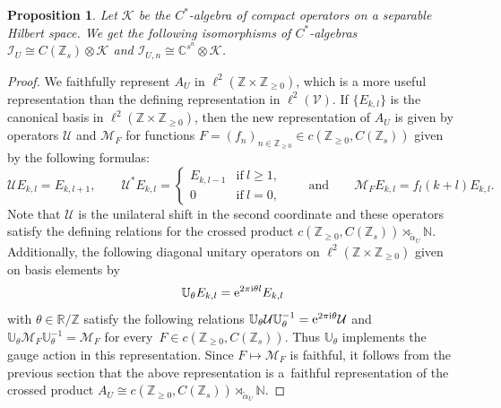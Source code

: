 \documentclass[pdftex]{sigma}
\newcommand{\R}{{\mathbb R}}
\newcommand{\C}{{\mathbb C}}
\newcommand{\N}{{\mathbb N}}
\newcommand{\Z}{{\mathbb Z}}
\newcommand{\kcal}{{\mathcal K}}
\newcommand{\fancyI}{\mathcal{I}}
\numberwithin{equation}{section}
\newtheorem{Proposition}[Theorem]{Proposition}
 { \theoremstyle{definition}
\newtheorem{Definition}[Theorem]{Definition}
\newtheorem{Note}[Theorem]{Note}
\newtheorem{Example}[Theorem]{Example}
\newtheorem{Remark}[Theorem]{Remark} }
\begin{document}
\begin{Proposition}\label{IUStructure}
Let $\mathcal{K}$ be the $C^*$-algebra of compact operators on a separable Hilbert space.
We get the following isomorphisms of $C^*$-algebras
$
\mathcal{I}_U\cong C(\Z_s)\otimes\mathcal{K}
$
and
$
\fancyI_{U,n}\cong \C^{s^n}\otimes \kcal$.
\end{Proposition}
\begin{proof}
We faithfully represent $A_U$ in $\ell^2(\Z\times\Z_{\ge0})$, which is a more useful representation than the defining representation in $\ell^2(\mathcal{V})$.
If $\{E_{k,l}\}$ is the canonical basis in $\ell^2(\Z\times\Z_{\ge0})$, then the new representation of $A_U$ is given by operators $\mathcal{U}$ and $\mathcal{M}_F$ for functions $F=(f_n)_{n\in \Z_{\ge0}}\in c(\Z_{\ge0}, C(\Z_s))$ given by the following formulas:
\begin{equation*}
\mathcal{U}E_{k,l}=E_{k, l+1} ,\qquad \mathcal{U}^*E_{k,l} =
\begin{cases}
E_{k, l-1} &\textrm{if}\ l\ge1,\\
0 &\textrm{if}\ l=0,
\end{cases}\qquad\text{and}\qquad \mathcal{M}_FE_{k,l} = f_l(k+l)E_{k,l} .
\end{equation*}
Note that $\mathcal{U}$ is the unilateral shift in the second coordinate and these operators satisfy the defining relations for the crossed product $c(\Z_{\ge0}, C(\Z_s))\rtimes_{\tilde{\alpha}_U}\N$. Additionally, the following diagonal unitary operators on $\ell^2(\Z\times\Z_{\ge0})$ given on basis elements by
\begin{equation}\label{repgauge}
\mathbb{U}_\theta E_{k,l}={\rm e}^{2\pi {\rm i}\theta l}E_{k,l}
\end{equation}
with $\theta\in \R/\Z$ satisfy the following relations
$\mathbb{U}_\theta \mathcal{U} \mathbb{U}_\theta^{-1} = {\rm e}^{2\pi {\rm i}\theta}\mathcal{U}$ and $ \mathbb{U}_\theta \mathcal{M}_F \mathbb{U}_\theta^{-1} = \mathcal{M}_F
$
for every~${F\in c(\Z_{\ge0}, C(\Z_s))}$. Thus $\mathbb{U}_\theta$ implements the gauge action in this representation. Since $F\mapsto \mathcal{M}_F$ is faithful, it follows from the previous section that the above representation is a~faithful representation of the crossed product $A_U \cong c(\Z_{\ge0}, C(\Z_s))\rtimes_{\tilde{\alpha}_U}\N$.


\end{proof}
\end{document}
